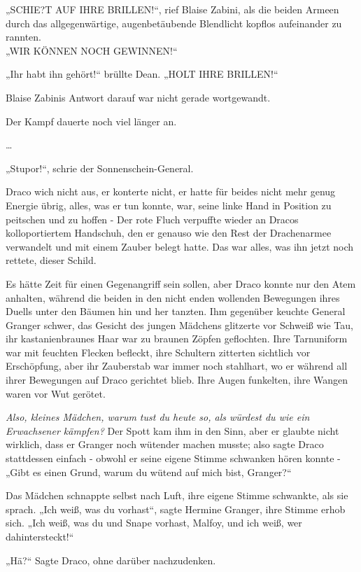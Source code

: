 {„SCHIE?T AUF IHRE BRILLEN!“, rief Blaise Zabini, als die beiden Armeen durch das allgegenwärtige, augenbetäubende Blendlicht kopflos aufeinander zu rannten.\\ „WIR KÖNNEN NOCH GEWINNEN!“

„Ihr habt ihn gehört!“ brüllte Dean. „HOLT IHRE BRILLEN!“

Blaise Zabinis Antwort darauf war nicht gerade wortgewandt.

Der Kampf dauerte noch viel länger an.

…

„Stupor!“, schrie der Sonnenschein-General.

Draco wich nicht aus, er konterte nicht, er hatte für beides nicht mehr genug Energie übrig, alles, was er tun konnte, war, seine linke Hand in Position zu peitschen und zu hoffen - Der rote Fluch verpuffte wieder an Dracos kolloportiertem Handschuh, den er genauso wie den Rest der Drachenarmee verwandelt und mit einem Zauber belegt hatte. Das war alles, was ihn jetzt noch rettete, dieser Schild.

Es hätte Zeit für einen Gegenangriff sein sollen, aber Draco konnte nur den Atem anhalten, während die beiden in den nicht enden wollenden Bewegungen ihres Duells unter den Bäumen hin und her tanzten. Ihm gegenüber keuchte General Granger schwer, das Gesicht des jungen Mädchens glitzerte vor Schweiß wie Tau, ihr kastanienbraunes Haar war zu braunen Zöpfen geflochten. Ihre Tarnuniform war mit feuchten Flecken befleckt, ihre Schultern zitterten sichtlich vor Erschöpfung, aber ihr Zauberstab war immer noch stahlhart, wo er während all ihrer Bewegungen auf Draco gerichtet blieb. Ihre Augen funkelten, ihre Wangen waren vor Wut gerötet.

\emph{Also, kleines Mädchen, warum tust du heute so, als würdest du wie ein Erwachsener kämpfen?} Der Spott kam ihm in den Sinn, aber er glaubte nicht wirklich, dass er Granger noch wütender machen musste; also sagte Draco stattdessen einfach - obwohl er seine eigene Stimme schwanken hören konnte -\\ „Gibt es einen Grund, warum du wütend auf mich bist, Granger?“

Das Mädchen schnappte selbst nach Luft, ihre eigene Stimme schwankte, als sie sprach. „Ich weiß, was du vorhast“, sagte Hermine Granger, ihre Stimme erhob sich. „Ich weiß, was du und Snape vorhast, Malfoy, und ich weiß, wer dahintersteckt!“

„Hä?“ Sagte Draco, ohne darüber nachzudenken.

}
